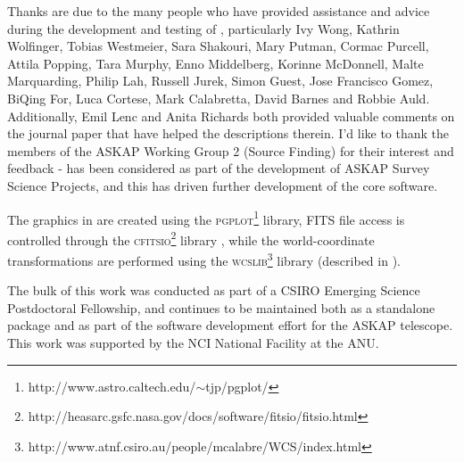 %
%
%
%

Thanks are due to the many people who have provided assistance and
advice during the development and testing of \duchamp, particularly
Ivy Wong, Kathrin Wolfinger, Tobias Westmeier, Sara Shakouri, Mary
Putman, Cormac Purcell, Attila Popping, Tara Murphy, Enno Middelberg,
Korinne McDonnell, Malte Marquarding, Philip Lah, Russell Jurek, Simon
Guest, Jose Francisco Gomez, BiQing For, Luca Cortese, Mark
Calabretta, David Barnes and Robbie Auld. Additionally, Emil Lenc and
Anita Richards both provided valuable comments on the journal paper
that have helped the descriptions therein. I'd like to thank the
members of the ASKAP Working Group 2 (Source Finding) for their
interest and feedback - \duchamp has been considered as part of the
development of ASKAP Survey Science Projects, and this has driven
further development of the core \duchamp software.

The graphics in \duchamp are created using the
\textsc{pgplot}\footnote{http://www.astro.caltech.edu/$\sim$tjp/pgplot/}
library, FITS file access is controlled through the
\textsc{cfitsio}\footnote{http://heasarc.gsfc.nasa.gov/docs/software/fitsio/fitsio.html}
library \citep{pence99}, while the world-coordinate transformations
are performed using the
\textsc{wcslib}\footnote{http://www.atnf.csiro.au/people/mcalabre/WCS/index.html}
library (described in \citet{calabretta02}).

The bulk of this work was conducted as part of a CSIRO Emerging
Science Postdoctoral Fellowship, and \duchamp continues to be
maintained both as a standalone package and as part of the software
development effort for the ASKAP telescope. This work was supported by
the NCI National Facility at the ANU.



